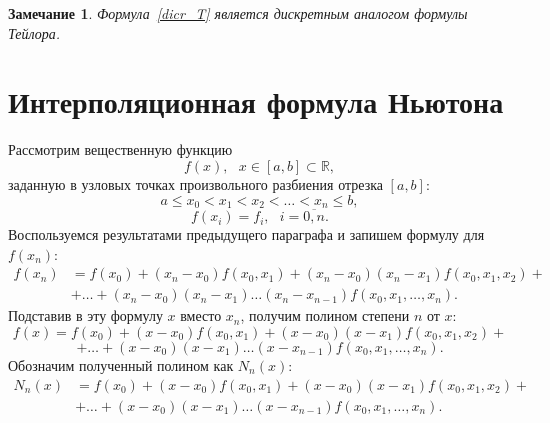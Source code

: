 \documentclass[11pt,a4paper,twoside,listtotoc,bibtotoc]{report}
\numberwithin{equation}{section}
\theoremstyle{definition}
\theoremstyle{plain}
\newtheorem*{note*}{Замечание}
\begin{document}
%
\begin{note*}
%
    Формула~\eqref{dicr_T} является дискретным аналогом формулы Тейлора.
%
\end{note*}

%
\section{Интерполяционная формула Ньютона}
%
Рассмотрим вещественную функцию
%
$$
    f(x), ~~~x\in[a,b]\subset\mathbb{R},
$$
%
заданную в узловых точках произвольного разбиения отрезка $[a,b]$:
%
$$
    a\leqslant x_0<x_1<x_2<\ldots<x_n\leqslant b,
$$
%
%
$$
    f(x_i) = f_i, ~~~ i=\overline{0, n}.
$$
%
Воспользуемся результатами предыдущего параграфа и запишем формулу для $f(x_n)$:
%
\begin{equation}
%
    \label{New_Poly}
    \begin{split}
        f(x_n)&=f(x_0)+(x_n-x_0)f(x_0,x_1)+(x_n-x_0)(x_n-x_1)f(x_0,x_1,x_2)+ \\
        &+\ldots+(x_n-x_0)(x_n-x_1)\ldots(x_n-x_{n-1})f(x_0,x_1,\ldots,x_n).
    \end{split}
%
\end{equation}
%
Подставив в эту формулу $x$ вместо $x_n$, получим полином
степени $n$ от $x$:
%
$$
    f(x)=f(x_0)+(x-x_0)f(x_0,x_1)+(x-x_0)(x-x_1)f(x_0,x_1,x_2)+
$$
%
$$
    +\ldots+(x-x_0)(x-x_1)\ldots(x-x_{n-1})f(x_0,x_1,\ldots,x_n).
$$
%
Обозначим полученный полином как $N_n(x)$:
%
\begin{equation}
%
    \label{Poly_N}
    \begin{split}
        N_n(x)&=f(x_0)+(x-x_0)f(x_0,x_1)+(x-x_0)(x-x_1)f(x_0,x_1,x_2)+ \\
        &+\ldots+(x-x_0)(x-x_1)\ldots(x-x_{n-1})f(x_0,x_1,\ldots,x_n).
    \end{split}
%
\end{equation}
%
%
\end{document}
